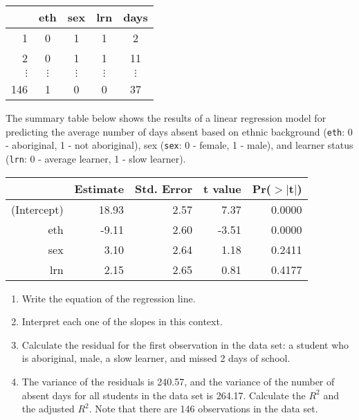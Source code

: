 \documentclass[
]{article}
\providecommand{\tightlist}{%
  \setlength{\itemsep}{0pt}\setlength{\parskip}{0pt}}
\begin{document}
\begin{center}
\begin{tabular}{r c c c c}
  \hline
      & eth     & sex   & lrn   & days \\   
  \hline
1   & 0         & 1         & 1         &   2 \\ 
2   & 0         & 1         & 1         &  11 \\ 
$\vdots$ & $\vdots$ & $\vdots$ & $\vdots$ & $\vdots$ \\ 
146 & 1         & 0         & 0         &  37 \\ 
  \hline
\end{tabular}
\end{center}

The summary table below shows the results of a linear regression model
for predicting the average number of days absent based on ethnic
background (\texttt{eth}: 0 - aboriginal, 1 - not aboriginal), sex
(\texttt{sex}: 0 - female, 1 - male), and learner status (\texttt{lrn}:
0 - average learner, 1 - slow learner).

\begin{center}
\begin{tabular}{rrrrr}
  \hline
            & Estimate  & Std. Error  & t value   & Pr($>$$|$t$|$) \\ 
  \hline
(Intercept) & 18.93     & 2.57        & 7.37      & 0.0000 \\ 
eth         & -9.11     & 2.60        & -3.51     & 0.0000 \\ 
sex         & 3.10      & 2.64        & 1.18      & 0.2411 \\ 
lrn         & 2.15      & 2.65        & 0.81      & 0.4177 \\ 
  \hline
\end{tabular}
\end{center}

\begin{enumerate}
\def\labelenumi{(\alph{enumi})}
\tightlist
\item
  Write the equation of the regression line.
\item
  Interpret each one of the slopes in this context.
\item
  Calculate the residual for the first observation in the data set: a
  student who is aboriginal, male, a slow learner, and missed 2 days of
  school.
\item
  The variance of the residuals is 240.57, and the variance of the
  number of absent days for all students in the data set is 264.17.
  Calculate the \(R^2\) and the adjusted \(R^2\). Note that there are
  146 observations in the data set.
\end{enumerate}
\end{document}
